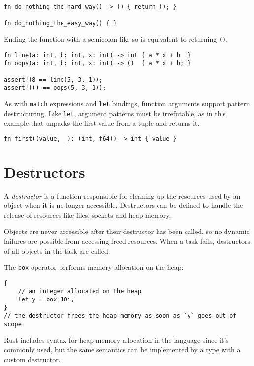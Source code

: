 \documentclass[]{article}
\begin{document}
\begin{verbatim}
fn do_nothing_the_hard_way() -> () { return (); }

fn do_nothing_the_easy_way() { }
\end{verbatim}

Ending the function with a semicolon like so is equivalent to returning
\texttt{()}.

\begin{verbatim}
fn line(a: int, b: int, x: int) -> int { a * x + b  }
fn oops(a: int, b: int, x: int) -> ()  { a * x + b; }

assert!(8 == line(5, 3, 1));
assert!(() == oops(5, 3, 1));
\end{verbatim}

As with \texttt{match} expressions and \texttt{let} bindings, function
arguments support pattern destructuring. Like \texttt{let}, argument
patterns must be irrefutable, as in this example that unpacks the first
value from a tuple and returns it.

\begin{verbatim}
fn first((value, _): (int, f64)) -> int { value }
\end{verbatim}

\section{Destructors}\label{destructors}

A \emph{destructor} is a function responsible for cleaning up the
resources used by an object when it is no longer accessible. Destructors
can be defined to handle the release of resources like files, sockets
and heap memory.

Objects are never accessible after their destructor has been called, so
no dynamic failures are possible from accessing freed resources. When a
task fails, destructors of all objects in the task are called.

The \texttt{box} operator performs memory allocation on the heap:

\begin{verbatim}
{
    // an integer allocated on the heap
    let y = box 10i;
}
// the destructor frees the heap memory as soon as `y` goes out of scope
\end{verbatim}

Rust includes syntax for heap memory allocation in the language since
it's commonly used, but the same semantics can be implemented by a type
with a custom destructor.
\end{document}
